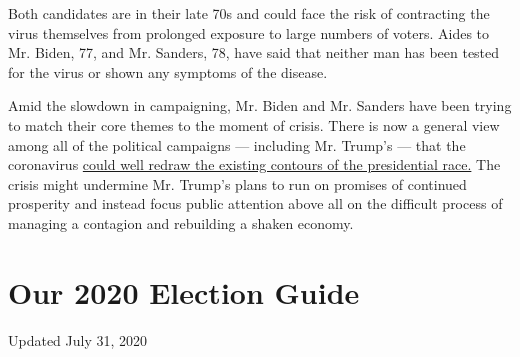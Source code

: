 Both candidates are in their late 70s and could face the risk of
contracting the virus themselves from prolonged exposure to large
numbers of voters. Aides to Mr. Biden, 77, and Mr. Sanders, 78, have
said that neither man has been tested for the virus or shown any
symptoms of the disease.

Amid the slowdown in campaigning, Mr. Biden and Mr. Sanders have been
trying to match their core themes to the moment of crisis. There is now
a general view among all of the political campaigns --- including Mr.
Trump's --- that the coronavirus
\href{https://www.nytimes.com/2020/03/12/us/politics/trump-vs-biden.html}{could
well redraw the existing contours of the presidential race.} The crisis
might undermine Mr. Trump's plans to run on promises of continued
prosperity and instead focus public attention above all on the difficult
process of managing a contagion and rebuilding a shaken economy.

\hypertarget{our-2020-election-guide}{%
\section{Our 2020 Election Guide}\label{our-2020-election-guide}}

Updated July 31, 2020

